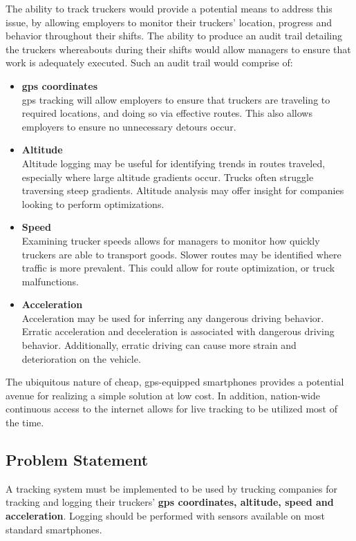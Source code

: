 The ability to track truckers would provide a potential means to address this issue, by allowing employers to monitor their truckers' location, progress and behavior throughout their shifts.
The ability to produce an audit trail detailing the truckers whereabouts during their shifts would allow managers to ensure that work is adequately executed. Such an audit trail would comprise of:
\begin{itemize}
\item \textbf{\ac{gps} coordinates\\}
\ac{gps} tracking will allow employers to ensure that truckers are traveling to required locations, and doing so via effective routes. This also allows employers to ensure no unnecessary detours occur.
\item \textbf{Altitude\\}
Altitude logging may be useful for identifying trends in routes traveled, especially where large altitude gradients occur.
Trucks often struggle traversing steep gradients.
Altitude analysis may offer insight for companies looking to perform optimizations.
\item \textbf{Speed\\}
Examining trucker speeds allows for managers to monitor how quickly truckers are able to transport goods.
Slower routes may be identified where traffic is more prevalent.
This could allow for route optimization, or truck malfunctions.
\item \textbf{Acceleration\\}
Acceleration may be used for inferring any dangerous driving behavior. 
Erratic acceleration and deceleration is associated with dangerous driving behavior.
Additionally, erratic driving can cause more strain and deterioration on the vehicle.
\end{itemize}

The ubiquitous nature of cheap, \ac{gps}-equipped smartphones provides a potential avenue for realizing a simple solution at low cost.
In addition, nation-wide continuous access to the internet allows for live tracking to be utilized most of the time.

\subsection{Problem Statement}
A tracking system must be implemented to be used by trucking companies for tracking and logging their truckers' \textbf{\ac{gps} coordinates, altitude, speed and acceleration}.
Logging should be performed with sensors available on most standard smartphones.

